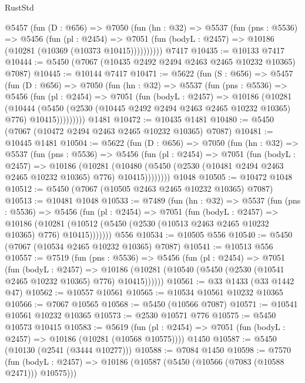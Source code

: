 \begin{lexlean}{RustStd}
\begin{coremodule}
      @5457
        (fun (D : @656) =>
        @7050
          (fun (hn : @32) =>
          @5537
            (fun (pns : @5536) =>
            @5456
              (fun (pl : @2454) =>
              @7051 (fun (bodyL : @2457) => @10186 (@10281 (@10369 (@10373 @10415))))))))))
    @7417
@10435 := @10133 @7417
@10444 := @5450 (@7067 (@10435 @2492 @2494 @2463 @2465 @10232 @10365) @7087)
@10445 := @10144 @7417
@10471 := @5622
    (fun (S : @656) =>
    @5457
      (fun (D : @656) =>
      @7050
        (fun (hn : @32) =>
        @5537
          (fun (pns : @5536) =>
          @5456
            (fun (pl : @2454) =>
            @7051
              (fun (bodyL : @2457) =>
              @10186
                (@10281
                  (@10444
                    (@5450
                      (@2530 (@10445 @2492 @2494 @2463 @2465 @10232 @10365) @776)
                      @10415)))))))))
    @1481
@10472 := @10435 @1481
@10480 := @5450 (@7067 (@10472 @2494 @2463 @2465 @10232 @10365) @7087)
@10481 := @10445 @1481
@10504 := @5622
    (fun (D : @656) =>
    @7050
      (fun (hn : @32) =>
      @5537
        (fun (pns : @5536) =>
        @5456
          (fun (pl : @2454) =>
          @7051
            (fun (bodyL : @2457) =>
            @10186
              (@10281
                (@10480 (@5450 (@2530 (@10481 @2494 @2463 @2465 @10232 @10365) @776) @10415))))))))
    @1048
@10505 := @10472 @1048
@10512 := @5450 (@7067 (@10505 @2463 @2465 @10232 @10365) @7087)
@10513 := @10481 @1048
@10533 := @7489
    (fun (hn : @32) =>
    @5537
      (fun (pns : @5536) =>
      @5456
        (fun (pl : @2454) =>
        @7051
          (fun (bodyL : @2457) =>
          @10186
            (@10281 (@10512 (@5450 (@2530 (@10513 @2463 @2465 @10232 @10365) @776) @10415)))))))
    @556
@10534 := @10505 @556
@10540 := @5450 (@7067 (@10534 @2465 @10232 @10365) @7087)
@10541 := @10513 @556
@10557 := @7519
    (fun (pns : @5536) =>
    @5456
      (fun (pl : @2454) =>
      @7051
        (fun (bodyL : @2457) =>
        @10186 (@10281 (@10540 (@5450 (@2530 (@10541 @2465 @10232 @10365) @776) @10415))))))
@10561 := @33 @1433 (@33 @1442 @47)
@10562 := @10557 @10561
@10565 := @10534 @10561 @10232 @10365
@10566 := @7067 @10565
@10568 := @5450 (@10566 @7087)
@10571 := @10541 @10561 @10232 @10365
@10573 := @2530 @10571 @776
@10575 := @5450 @10573 @10415
@10583 := @5619
    (fun (pl : @2454) => @7051 (fun (bodyL : @2457) => @10186 (@10281 (@10568 @10575))))
    @1450
@10587 := @5450 (@10130 (@2541 (@3444 @10277)))
@10588 := @7084 @1450
@10598 := @7570
    (fun (bodyL : @2457) => @10186 (@10587 (@5450 (@10566 (@7083 (@10588 @2471))) @10575)))

\end{coremodule}
\end{lexlean}
